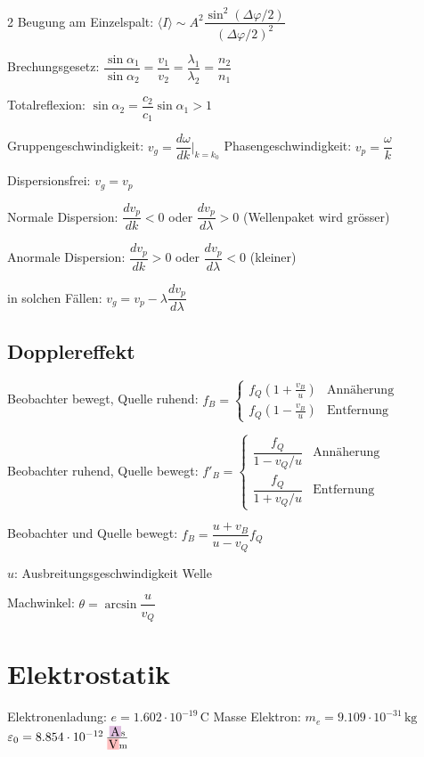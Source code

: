 \documentclass[10pt,a4paper]{article}
\newcommand{\chbox}[1]{%
  \par\vspace{2pt}\noindent%
  \colorbox{magenta!25}{\parbox{\dimexpr\linewidth-2\fboxsep\relax}{#1}}%
  \par\vspace{2pt}}
\newcommand{\icc}[1]{{\setlength\fboxsep{1pt}\colorbox{violet!25}{\ensuremath{#1}}}}
\newcommand{\vc}[1]{{\setlength\fboxsep{1pt}\colorbox{red!25}{\ensuremath{#1}}}}
\begin{document}
\begin{multicols}{2}
Beugung am Einzelspalt: $\langle I\rangle\sim A^2\dfrac{\sin^2(\Delta\varphi/2)}{(\Delta\varphi/2)^2}$

Brechungsgesetz: $\boxed{\dfrac{\sin\alpha_1}{\sin\alpha_2}=\dfrac{v_1}{v_2}=\dfrac{\lambda_1}{\lambda_2}=\dfrac{n_2}{n_1}}$

Totalreflexion: $\sin\alpha_2=\dfrac{c_2}{c_1}\sin\alpha_1>1$

Gruppengeschwindigkeit: $v_g=\dfrac{d\omega}{dk}\big|_{k=k_0}$ \quad Phasengeschwindigkeit: $v_p=\dfrac{\omega}{k}$

Dispersionsfrei: $v_g=v_p$

Normale Dispersion: $\dfrac{dv_p}{dk}<0$ oder $\dfrac{dv_p}{d\lambda}>0$ (Wellenpaket wird grösser)

Anormale Dispersion: $\dfrac{dv_p}{dk}>0$ oder $\dfrac{dv_p}{d\lambda}<0$ (kleiner)

in solchen Fällen: $v_g=v_p-\lambda\dfrac{dv_p}{d\lambda}$

\subsection{Dopplereffekt}

Beobachter bewegt, Quelle ruhend:
$f_B=\begin{cases}f_Q\!\left(1+\frac{v_B}{u}\right) & \text{Annäherung}\\f_Q\!\left(1-\frac{v_B}{u}\right) & \text{Entfernung}\end{cases}$

Beobachter ruhend, Quelle bewegt:
$f'_B=\begin{cases}\dfrac{f_Q}{1-v_Q/u} & \text{Annäherung}\\\dfrac{f_Q}{1+v_Q/u} & \text{Entfernung}\end{cases}$

Beobachter und Quelle bewegt: $\boxed{f_B=\dfrac{u+v_B}{u-v_Q}f_Q}$

$u$: Ausbreitungsgeschwindigkeit Welle

Machwinkel: $\theta=\arcsin\dfrac{u}{v_Q}$

\section{Elektrostatik}

\chbox{Elektronenladung: $e=1.602\cdot10^{-19}\,\text{C}$ \quad Masse Elektron: $m_e=9.109\cdot10^{-31}\,\text{kg}$ \quad $\varepsilon_0=8.854\cdot10^{-12}\,\frac{\icc{\text{A}}\text{s}}{\vc{\text{V}}\text{m}}$}


\end{multicols}
\end{document}
